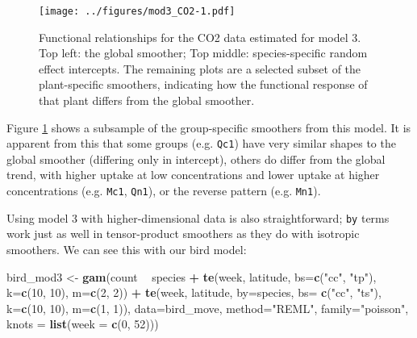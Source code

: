 \documentclass[12pt]{article}
\newenvironment{Shaded}{\begin{snugshade}}{\end{snugshade}}
\newcommand{\KeywordTok}[1]{\textcolor[rgb]{0.13,0.29,0.53}{\textbf{#1}}}
\newcommand{\DataTypeTok}[1]{\textcolor[rgb]{0.13,0.29,0.53}{#1}}
\newcommand{\DecValTok}[1]{\textcolor[rgb]{0.00,0.00,0.81}{#1}}
\newcommand{\StringTok}[1]{\textcolor[rgb]{0.31,0.60,0.02}{#1}}
\newcommand{\OperatorTok}[1]{\textcolor[rgb]{0.81,0.36,0.00}{\textbf{#1}}}
\newcommand{\NormalTok}[1]{#1}
\begin{document}
\begin{figure}
\centering
\texttt{[image: ../figures/mod3\_CO2-1.pdf]}
\caption{\label{fig:co2_mod3}Functional relationships for the CO2 data
estimated for model 3. Top left: the global smoother; Top middle:
species-specific random effect intercepts. The remaining plots are a
selected subset of the plant-specific smoothers, indicating how the
functional response of that plant differs from the global smoother.}
\end{figure}

Figure \ref{fig:co2_mod3} shows a subsample of the group-specific
smoothers from this model. It is apparent from this that some groups
(e.g. \texttt{Qc1}) have very similar shapes to the global smoother
(differing only in intercept), others do differ from the global trend,
with higher uptake at low concentrations and lower uptake at higher
concentrations (e.g. \texttt{Mc1}, \texttt{Qn1}), or the reverse pattern
(e.g. \texttt{Mn1}).

Using model 3 with higher-dimensional data is also straightforward;
\texttt{by} terms work just as well in tensor-product smoothers as they
do with isotropic smoothers. We can see this with our bird model:

\begin{Shaded}
\begin{Highlighting}[]
\NormalTok{bird_mod3 <-}\StringTok{ }\KeywordTok{gam}\NormalTok{(count }\OperatorTok{~}\StringTok{ }\NormalTok{species }\OperatorTok{+}
\StringTok{                   }\KeywordTok{te}\NormalTok{(week, latitude, }\DataTypeTok{bs=}\KeywordTok{c}\NormalTok{(}\StringTok{"cc"}\NormalTok{, }\StringTok{"tp"}\NormalTok{),}
                      \DataTypeTok{k=}\KeywordTok{c}\NormalTok{(}\DecValTok{10}\NormalTok{, }\DecValTok{10}\NormalTok{), }\DataTypeTok{m=}\KeywordTok{c}\NormalTok{(}\DecValTok{2}\NormalTok{, }\DecValTok{2}\NormalTok{)) }\OperatorTok{+}
\StringTok{                   }\KeywordTok{te}\NormalTok{(week, latitude, }\DataTypeTok{by=}\NormalTok{species, }\DataTypeTok{bs=} \KeywordTok{c}\NormalTok{(}\StringTok{"cc"}\NormalTok{, }\StringTok{"ts"}\NormalTok{),}
                      \DataTypeTok{k=}\KeywordTok{c}\NormalTok{(}\DecValTok{10}\NormalTok{, }\DecValTok{10}\NormalTok{), }\DataTypeTok{m=}\KeywordTok{c}\NormalTok{(}\DecValTok{1}\NormalTok{, }\DecValTok{1}\NormalTok{)),}
                 \DataTypeTok{data=}\NormalTok{bird_move, }\DataTypeTok{method=}\StringTok{"REML"}\NormalTok{, }\DataTypeTok{family=}\StringTok{"poisson"}\NormalTok{,}
                 \DataTypeTok{knots =} \KeywordTok{list}\NormalTok{(}\DataTypeTok{week =} \KeywordTok{c}\NormalTok{(}\DecValTok{0}\NormalTok{, }\DecValTok{52}\NormalTok{)))}
\end{Highlighting}
\end{Shaded}
\end{document}
